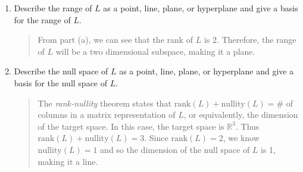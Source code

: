 \documentclass[letter]{article}
\newcommand{\R}{\mathbb{R}}
\newcommand{\Nullity}{\mathrm{nullity}}
\newcommand{\Rank}{\mathrm{rank}}
\begin{document}
\begin{enumerate}
\begin{enumerate}
			\item Describe the range of $L$ as a point, line, plane, or hyperplane and
				give a basis for the range of $L$.
				\begin{quote}
					From part (a), we can see that the rank of $L$ is 2. Therefore, the range
					of $L$ will be a two dimensional subspace, making it a plane.
				\end{quote}
			\item Describe the null space of $L$ as a point, line, plane, or hyperplane and
				give a basis for the null space of $L$.
				\begin{quote}
					The \emph{rank-nullity} theorem states that $\Rank(L)+\Nullity(L)=\#$ of columns in a
					matrix representation of $L$, or equivalently, the dimension of the target space. 
					In this case, the target space is
					$\R^3$.  Thus $\Rank(L)+\Nullity(L)=3$.  Since $\Rank(L)=2$, we know
					$\Nullity(L)=1$ and so the dimension of the null space of $L$ is 1, making it a line.
				\end{quote}
		\end{enumerate}

	\end{enumerate}
\end{document}
